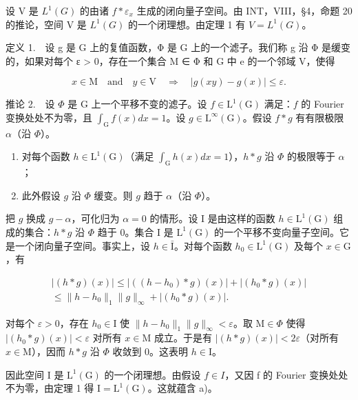设 V 是 \(L^{1}(G)\) 的由诸 \(f*\varepsilon_{x}\) 生成的闭向量子空间。由 INT，VIII，§4，命题 20 的推论，空间 V 是 \(L^{1}(G)\) 的一个闭理想。由定理 1 有 \(V = L^{1}(G)\)。

定义 1.　设 g 是 G 上的复值函数，Φ 是 G 上的一个滤子。我们称 g 沿 Φ 是缓变的，如果对每个 ε \textgreater{} 0，存在一个集合 M ∈ Φ 和 G 中 e 的一个邻域 V，使得

\[
 x \in \mathrm{M} \quad \text {and} \quad y \in \mathrm{V} \quad \Longrightarrow \quad | g (x y) - g (x) | \leqslant \varepsilon .
\]

推论 2.　设 \(\Phi\) 是 G 上一个平移不变的滤子。设 \(f \in \mathrm{L}^{1}(\mathrm{G})\) 满足：\(f\) 的 Fourier 变换处处不为零，且 \(\int_{\mathrm{G}} f(x) dx = 1\)。设 \(g \in \mathrm{L}^{\infty}(\mathrm{G})\)。假设 \(f * g\) 有有限极限 \(\alpha\)（沿 \(\Phi\)）。

\begin{enumerate}
\def\labelenumi{\alph{enumi})}
\item
  对每个函数 \(h \in \mathrm{L}^{1}(\mathrm{G})\)（满足 \(\int_{\mathrm{G}} h(x) dx = 1\)），\(h * g\) 沿 \(\Phi\) 的极限等于 \(\alpha\)；
\item
  此外假设 \(g\) 沿 \(\Phi\) 缓变。则 \(g\) 趋于 \(\alpha\)（沿 \(\Phi\)）。
\end{enumerate}

把 \(g\) 换成 \(g - \alpha\)，可化归为 \(\alpha = 0\) 的情形。设 I 是由这样的函数 \(h \in \mathrm{L}^1(\mathrm{G})\) 组成的集合：\(h*g\) 沿 \(\Phi\) 趋于 0。集合 I 是 \(\mathrm{L}^1(\mathrm{G})\) 的一个平移不变向量子空间。它是一个闭向量子空间。事实上，设 \(h \in \bar{\mathrm{I}}\)。对每个函数 \(h_0 \in \mathrm{L}^1(\mathrm{G})\) 及每个 \(x \in \mathrm{G}\)，有

\[
\begin{array}{c} | (h * g) (x) | \leqslant | ((h - h _ {0}) * g) (x) | + | (h _ {0} * g) (x) | \\ \leqslant \| h - h _ {0} \| _ {1} \| g \| _ {\infty} + | (h _ {0} * g) (x) |. \end{array}
\]

对每个 \(\varepsilon > 0\)，存在 \(h_0 \in \mathrm{I}\) 使 \(\|h - h_0\|_1 \|g\|_\infty < \varepsilon\)。取 \(\mathrm{M} \in \Phi\) 使得 \(|(h_0 * g)(x)| < \varepsilon\) 对所有 \(x \in \mathrm{M}\) 成立。于是有 \(|(h * g)(x)| < 2\varepsilon\)（对所有 \(x \in \mathrm{M}\)），因而 \(h * g\) 沿 \(\Phi\) 收敛到 0。这表明 \(h \in \mathrm{I}\)。

因此空间 I 是 \(\mathrm{L}^{1}(\mathrm{G})\) 的一个闭理想。由假设 \(f \in I\)，又因 f 的 Fourier 变换处处不为零，由定理 1 得 \(\mathrm{I} = \mathrm{L}^{1}(\mathrm{G})\)。这就蕴含 a)。


